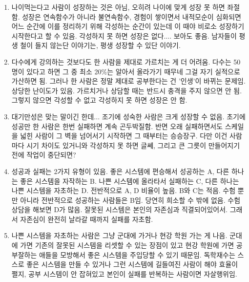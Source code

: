 \begin{enumerate}
    \item 나이먹는다고 사람이 성장하는 것은 아님, 오히려 나이에 맞게 성장 못 하면 좌절함.
    성장은 연속함수가 아니라 불연속함수, 경험이 쌓이면서 내적모순이 심화되면
    어느 순간에 이를 정리하기 위해 각성하는 순간이 있는데 이 때야 비로소 성장하기 시작한다고 할 수 있음.
    각성하지 못 하면 성장은 없다.... 보아도 좋음. 남자들이 평생 철이 들지 않는단 이야기는, 평생 성장할 수 있단 이야기.
    \vspace{5mm}

    \item 다수에게 강의하는 것보다도 한 사람을 제대로 가르치는 게 더 어려움.
    다수는 50명이 있다고 하면 그 중 최소 20$\%$는 알아서 올라가기 때무네 그걸 자기 실적으로 가산하면 됨.
    그러나 한 사람은 정말 제대로 공부한다는 건 '인생'이 바뀌는 문제임. 상당한 난이도가 있음.
    가르치거나 상담할 때는 반드시 충격을 주지 않으면 안 됨. 그렇지 않으면 각성할 수 없고 각성하지 못 하면 성장은 안 함.
    \vspace{5mm}

    \item 대기만성은 맞는 말이긴 한데...
    조기에 성숙한 사람은 크게 성장할 수 없음. 초기에 성공만 한 사람은 한번 실패하면 계속 곤두박질함.
    반면 오래 실패하면서도 스케일을 넓힌 사람이 그 벽을 넘어서기 시작하면 그 때부터는 승승장구.
    다만 이건 사람마다 시기 차이도 있거니와 각성하지 못 하면 글쎄, 그리고 큰 그릇이 만들어지기 전에 작업이 중단되면?
    \vspace{5mm}

    \item 성공과 실패는 2가지 유형이 있음.
    좋은 시스템에 편승해서 성공하는 A, 다른 하나는 좋은 시스템을 자작하는 B.
    나쁜 시스템에 올라타서 실패하는 C, 다른 하나는 나쁜 시스템을 자초하는 D.
    전반적으로 A, D 비율이 높음. B와 C는 적음.
    수험 뿐만 아니라 전반적으로 성공하는 사람들은 B임. 당연히 희소할 수 밖에 없음.
    수험 상담을 해보면 D가 많음.
    잘못된 시스템은 본인의 자존심과 직결되어있어서.
    그래서 자존심이 완전히 날라갈 때까지 실패를 자초함.
    \vspace{5mm}

    \item 나쁜 시스템을 자초하는 사람은 그냥 군대에 가거나 현강 학원 가는 게 나음.
    군대에 가면 기존의 잘못된 시스템을 리셋할 수 있는 장점이 있고
    현강 학원에 가면 공부잘하는 애들을 모방해서 좋은 시스템을 주입당할 수 있기 때문임.
    독학재수는 스스로 좋은 시스템을 만들 수 있거나 그런 시스템에 길들여진 사람이 해야 효율이 쩔지,
    공부 시스템이 안 잡혀있고 본인이 실패를 반복하는 사람이면 자살행위임.
    \vspace{5mm}


\end{enumerate}

